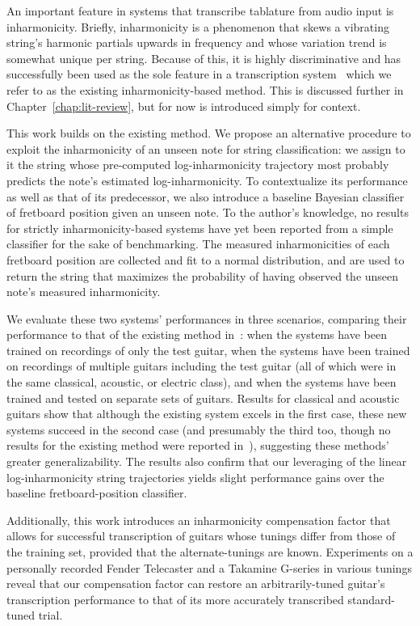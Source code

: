 \documentclass[12pt]{cmuthesis}
\begin{document}
An important feature in systems that transcribe tablature from audio input is inharmonicity. Briefly, inharmonicity is a phenomenon that skews a vibrating string's harmonic partials upwards in frequency and whose variation trend is somewhat unique per string. Because of this, it is highly discriminative and has successfully been used as the sole feature in a transcription system~\cite{barbanchoi2012} which we refer to as the existing inharmonicity-based method. This is discussed further in Chapter~\ref{chap:lit-review}, but for now is introduced simply for context.

This work builds on the existing method. We propose an alternative procedure to exploit the inharmonicity of an unseen note for string classification: we assign to it the string whose pre-computed log-inharmonicity trajectory most probably predicts the note's estimated log-inharmonicity. To contextualize its performance as well as that of its predecessor, we also introduce a baseline Bayesian classifier of fretboard position given an unseen note. To the author's knowledge, no results for strictly inharmonicity-based systems have yet been reported from a simple classifier for the sake of benchmarking. The measured inharmonicities of each fretboard position are collected and fit to a normal distribution, and are used to return the string that maximizes the probability of having observed the unseen note's measured inharmonicity.

We evaluate these two systems' performances in three scenarios, comparing their performance to that of the existing method in~\cite{barbanchoi2012}: when the systems have been trained on recordings of only the test guitar, when the systems have been trained on recordings of multiple guitars including the test guitar (all of which were in the same classical, acoustic, or electric class), and when the systems have been trained and tested on separate sets of guitars. Results for classical and acoustic guitars show that although the existing system excels in the first case, these new systems succeed in the second case (and presumably the third too, though no results for the existing method were reported in~\cite{barbanchoi2012}), suggesting these methods' greater generalizability. The results also confirm that our leveraging of the linear log-inharmonicity string trajectories yields slight performance gains over the baseline fretboard-position classifier.

Additionally, this work introduces an inharmonicity compensation factor that allows for successful transcription of guitars whose tunings differ from those of the training set, provided that the alternate-tunings are known. Experiments on a personally recorded Fender Telecaster and a Takamine G-series in various tunings reveal that our compensation factor can restore an arbitrarily-tuned guitar's transcription performance to that of its more accurately transcribed standard-tuned trial.
\end{document}
